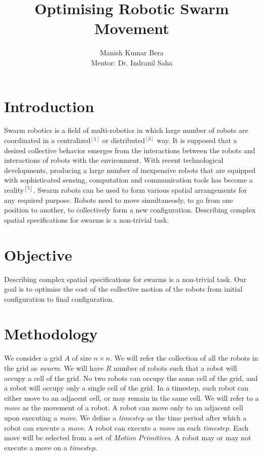 \documentclass{article}[11pt]
\title{Optimising Robotic Swarm Movement}
\author{Manish Kumar Bera \\
Mentor: Dr. Indranil Saha
}
\begin{document}
	\maketitle

	\section{Introduction}
		Swarm robotics is a field of multi-robotics in which large number of robots are coordinated in a centralized$^{[1]}$ or distributed$^{[3]}$ way.
		It is supposed that a desired collective behavior emerges from the interactions between the robots and interactions of robots with the environment.
		With  recent  technological  developments, producing a large number of inexpensive robots that are  equipped  with  sophisticated  sensing,  computation and communication tools has become a reality$^{[5]}$. 
		Swarm robots can be used to form various spatial arrangements for any required purpose.
		Robots need to move simultaneosly, to go from one position to another, to collectively form a new configuration.
		Describing  complex  spatial  specifications  for  swarms  is a  non-trivial  task.


	\section{Objective}
		Describing  complex  spatial  specifications  for  swarms  is a  non-trivial  task.
		Our goal is to optimise the cost of the collective motion of the robots from initial configuration to final configuration.

	\section{Methodology}
		We consider a grid $A$ of size $n \times n$.
		We will refer the collection of all the robots in the grid as \textit{swarm}. 
		We will have $R$ number of robots such that a robot will occupy a cell of the grid.
		No two robots can occupy the same cell of the grid, and a robot will occupy only a single cell of the grid.
		In a timestep, each robot can either move to an adjacent cell, or may remain in the same cell.
		We will refer to a \textit{move} as the movement of a robot.
		A robot can move only to an adjacent cell upon executing a \textit{move}.
		We define a \textit{timestep} as the time period after which a robot can execute a \textit{move}.
		A robot can execute a \textit{move} on each \textit{timestep}.
		Each move will be selected from a set of \textit{Motion Primitives}. 
		A robot may or may not execute a move on a \textit{timestep}.
\end{document}
